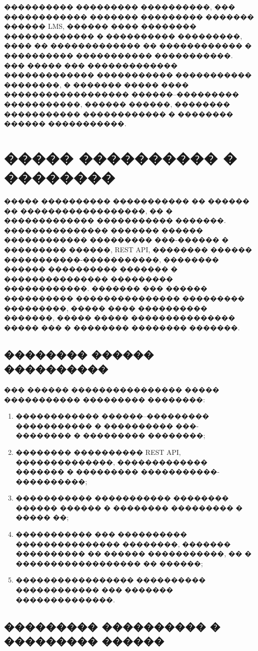 ���������� ��������� ����������, ��� ������������ ������� ��������� ������� ������ LMS, ������ ���� �������� ������������� � ���������� ���������, ���� �� ������������� �� ������������ � ���������� ����������� �����������. ��� ����� ��� ������������� ������������� ����������� ����������� ��������, � ������� ����� ���� ������������������ ������--��������� �����������, ������ ������, �������� ����������� ������������ � �������� ������ �����������.

\section{����� ���������� � ��������}

����� ���������� ����������� �� ������ �� ������������������, �� � ������������� ����������� �������. ��������������� ������� ������ ������������ ��������� ���-������ � ��������� ������, REST API, �������� ������ �����������-�����������, �������� ������ ���������� ������� � ��������������� ��������� ������������. ������� ��� ������ ���������� ��������������� ��������� ���������, ����� ���� ���������� �������, ����� ����� ��������������� ����� ��� � �������� �������� �������.

\subsection{�������� ������ ����������}

��� ������ ���������������� ����� ����������� ��������� ��������:
\begin{enumerate}
  \item ������������ ������--��������� ����������� � ���������� ���-�������� � ��������� ��������;
  \item �������� ���������� REST API, ��������������, ������������� ������� � ��������� �����������-����������;
  \item ����������� ����������� �������� ������ ������ � �������� ��������� � ����� ��;
  \item ����������� ��� ���������� ��������������� ��������, ������� ���������� �� ������ �����������, �� � ������������������ �� ������;
  \item ����������������� ���������� ������������ ��� ������� ��������������.
\end{enumerate}

\subsection{��������� ���������� � ��������� ������}

